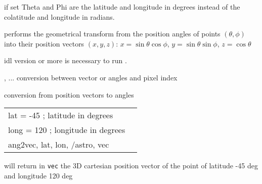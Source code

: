 \begin{keywords}
  \begin{kwlist}{} %
    \item[ASTRO\mytarget{idl:ang2vec:ASTRO}%
 =] if set Theta and Phi are the latitude and longitude in
    degrees instead of the colatitude and longitude in radians.
  \end{kwlist}
\end{keywords}  

\begin{codedescription}
{\facname performs the geometrical transform from the position angles of points 
$(\theta,\phi)$
into their position vectors $(x,y,z)$:
$x = \sin\theta\cos\phi$, $y=\sin\theta\sin\phi$, $z=\cos\theta$}
\end{codedescription}



\begin{related}
  \begin{sulist}{} %
    \item[idl] version \idlversion or more is necessary to run \facname.	
    \item[\htmlref{pix2xxx}{idl:pix_tools}, ... ] conversion between vector or angles and pixel index
    \item[\htmlref{vec2ang}{idl:vec2ang}] conversion from position vectors to angles
  \end{sulist}
\end{related}

\begin{example}
{
\begin{tabular}{ll} %
lat = -45 ; latitude in degrees \\
long = 120 ; longitude in degrees \\
ang2vec, lat, lon, /astro, vec
\end{tabular}
}
{will return in {\tt vec} the 3D cartesian position vector of the point of latitude -45 deg and longitude 120 deg
}
\end{example}

